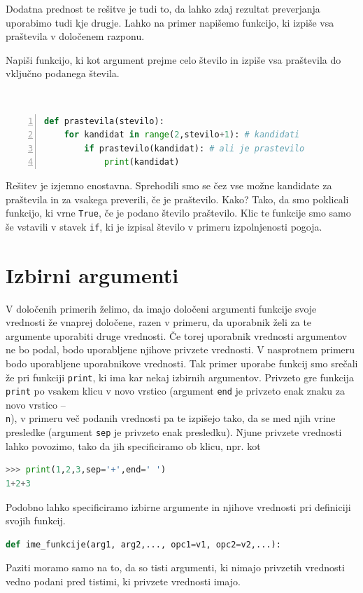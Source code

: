 Dodatna prednost te rešitve je tudi to, da lahko zdaj rezultat preverjanja uporabimo tudi kje drugje. Lahko na primer napišemo funkcijo, ki izpiše vsa praštevila v določenem razponu.
\begin{zgled}
Napiši funkcijo, ki kot argument prejme celo število in izpiše vsa praštevila do vključno podanega števila.
\end{zgled}
\begin{resitev} \  
\begin{lstlisting}[language=Python, showstringspaces=false,numbers=left]
def prastevila(stevilo):
    for kandidat in range(2,stevilo+1): # kandidati
        if prastevilo(kandidat): # ali je prastevilo
            print(kandidat)
\end{lstlisting}
\end{resitev}
Rešitev je izjemno enostavna. Sprehodili smo se čez vse možne kandidate za praštevila in za vsakega preverili, če je praštevilo. Kako? Tako, da smo poklicali funkcijo, ki vrne \texttt{True}, če je podano število praštevilo. Klic te funkcije smo samo še vstavili v stavek \texttt{if}, ki je izpisal število v primeru izpolnjenosti pogoja.

\section{Izbirni argumenti}
V določenih primerih želimo, da imajo določeni argumenti funkcije svoje vrednosti že vnaprej določene, razen v primeru, da uporabnik želi za te argumente uporabiti druge vrednosti. Če torej uporabnik vrednosti argumentov ne bo podal, bodo uporabljene njihove privzete vrednosti. V nasprotnem primeru bodo uporabljene uporabnikove vrednosti. Tak primer uporabe funkcij smo srečali že pri funkciji \texttt{print}, ki ima kar nekaj izbirnih argumentov. Privzeto gre funkcija \texttt{print} po vsakem klicu v novo vrstico (argument \texttt{end} je privzeto enak znaku za novo vrstico -- \texttt{\\n}), v primeru več podanih vrednosti pa te izpišejo tako, da se med njih vrine presledke (argument \texttt{sep} je privzeto enak presledku). Njune privzete vrednosti lahko povozimo, tako da jih specificiramo ob klicu, npr. kot
\begin{lstlisting}[language=Python, showstringspaces=false]
>>> print(1,2,3,sep='+',end=' ')
1+2+3
\end{lstlisting}
Podobno lahko specificiramo izbirne argumente in njihove vrednosti pri definiciji svojih funkcij. 
\begin{lstlisting}[language=Python, showstringspaces=false]
def ime_funkcije(arg1, arg2,..., opc1=v1, opc2=v2,...):
\end{lstlisting}
Paziti moramo samo na to, da so tisti argumenti, ki nimajo privzetih vrednosti vedno podani pred tistimi, ki privzete vrednosti imajo.

